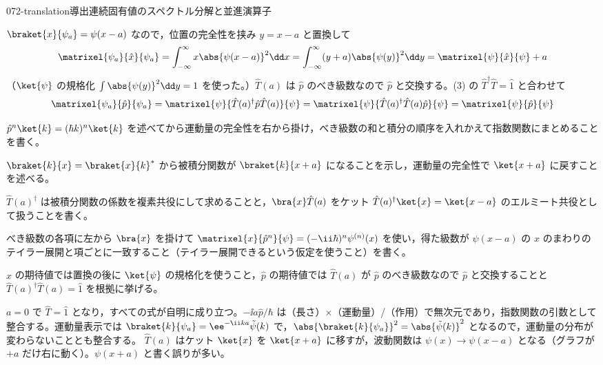 \documentclass[uplatex,dvipdfmx,a4paper,11pt]{jsarticle}
\begin{document}
\begin{mondai}{072-translation}{導出}{連続固有値のスペクトル分解と並進演算子}
\begin{tadashii}
 $\braket{x}{\psi_{a}}=\psi(x-a)$ なので，位置の完全性を挟み $y=x-a$ と置換して
\[ \matrixel{\psi_{a}}{\hat{x}}{\psi_{a}}=\int_{-\infty}^{\infty}x\abs{\psi(x-a)}^{2}\dd x=\int_{-\infty}^{\infty}(y+a)\abs{\psi(y)}^{2}\dd y=\matrixel{\psi}{\hat{x}}{\psi}+a \]
（$\ket{\psi}$ の規格化 $\int\abs{\psi(y)}^{2}\dd y=1$ を使った。）$\hat{T}(a)$ は $\hat{p}$ のべき級数なので $\hat{p}$ と交換する。(3) の $\hat{T}^{\dagger}\hat{T}=\hat{1}$ と合わせて
\[ \matrixel{\psi_{a}}{\hat{p}}{\psi_{a}}=\matrixel{\psi}{\hat{T}(a)^{\dagger}\hat{p}\hat{T}(a)}{\psi}=\matrixel{\psi}{\hat{T}(a)^{\dagger}\hat{T}(a)\hat{p}}{\psi}=\matrixel{\psi}{\hat{p}}{\psi} \]
\begin{ronten}
  \item {} $\hat{p}^{n}\ket{k}=(\hbar k)^{n}\ket{k}$ を述べてから運動量の完全性を右から掛け，べき級数の和と積分の順序を入れかえて指数関数にまとめることを書く。
  \item {} $\braket{k}{x}=\braket{x}{k}^{*}$ から被積分関数が $\braket{k}{x+a}$ になることを示し，運動量の完全性で $\ket{x+a}$ に戻すことを述べる。
  \item {} $\hat{T}(a)^{\dagger}$ は被積分関数の係数を複素共役にして求めることと，$\bra{x}\hat{T}(a)$ をケット $\hat{T}(a)^{\dagger}\ket{x}=\ket{x-a}$ のエルミート共役として扱うことを書く。
  \item {} べき級数の各項に左から $\bra{x}$ を掛けて $\matrixel{x}{\hat{p}^{n}}{\psi}=(-\ii\hbar)^{n}\psi^{(n)}(x)$ を使い，得た級数が $\psi(x-a)$ の $x$ のまわりのテイラー展開と項ごとに一致すること（テイラー展開できるという仮定を使うこと）を書く。
  \item {} $\hat{x}$ の期待値では置換の後に $\ket{\psi}$ の規格化を使うこと，$\hat{p}$ の期待値では $\hat{T}(a)$ が $\hat{p}$ のべき級数なので $\hat{p}$ と交換することと $\hat{T}(a)^{\dagger}\hat{T}(a)=\hat{1}$ を根拠に挙げる。
\end{ronten}
\kenzan $a=0$ で $\hat{T}=\hat{1}$ となり，すべての式が自明に成り立つ。$-\ii a\hat{p}/\hbar$ は（長さ）$\times$（運動量）/（作用）で無次元であり，指数関数の引数として整合する。運動量表示では $\braket{k}{\psi_{a}}=\ee^{-\ii ka}\tilde{\psi}(k)$ で，$\abs{\braket{k}{\psi_{a}}}^{2}=\abs{\tilde{\psi}(k)}^{2}$ となるので，運動量の分布が変わらないこととも整合する。
\tsumazuki $\hat{T}(a)$ はケット $\ket{x}$ を $\ket{x+a}$ に移すが，波動関数は $\psi(x)\to\psi(x-a)$ となる（グラフが $+a$ だけ右に動く）。$\psi(x+a)$ と書く誤りが多い。
\end{tadashii}
\end{mondai}
\end{document}
